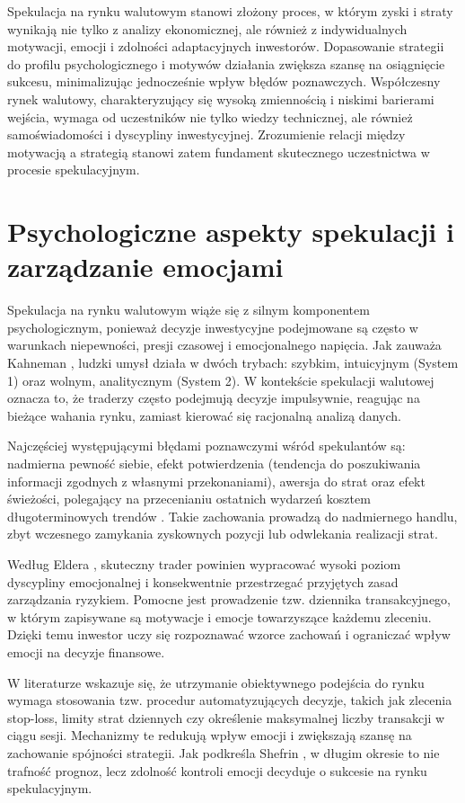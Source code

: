 Spekulacja na rynku walutowym stanowi złożony proces, w którym zyski i straty wynikają nie tylko z analizy ekonomicznej, ale również z indywidualnych motywacji, emocji i zdolności adaptacyjnych inwestorów. 
Dopasowanie strategii do profilu psychologicznego i motywów działania zwiększa szansę na osiągnięcie sukcesu, minimalizując jednocześnie wpływ błędów poznawczych. 
Współczesny rynek walutowy, charakteryzujący się wysoką zmiennością i niskimi barierami wejścia, wymaga od uczestników nie tylko wiedzy technicznej, ale również samoświadomości i dyscypliny inwestycyjnej. 
Zrozumienie relacji między motywacją a strategią stanowi zatem fundament skutecznego uczestnictwa w procesie spekulacyjnym.

\section{Psychologiczne aspekty spekulacji i zarządzanie emocjami}

Spekulacja na rynku walutowym wiąże się z silnym komponentem psychologicznym, ponieważ decyzje inwestycyjne podejmowane są często w warunkach niepewności, presji czasowej i emocjonalnego napięcia. 
Jak zauważa Kahneman \parencite{kahneman2011}, ludzki umysł działa w dwóch trybach: szybkim, intuicyjnym (System 1) oraz wolnym, analitycznym (System 2). 
W kontekście spekulacji walutowej oznacza to, że traderzy często podejmują decyzje impulsywnie, reagując na bieżące wahania rynku, zamiast kierować się racjonalną analizą danych. 

Najczęściej występującymi błędami poznawczymi wśród spekulantów są: nadmierna pewność siebie, efekt potwierdzenia (tendencja do poszukiwania informacji zgodnych z własnymi przekonaniami), 
awersja do strat oraz efekt świeżości, polegający na przecenianiu ostatnich wydarzeń kosztem długoterminowych trendów \parencite{shefrin2007}. 
Takie zachowania prowadzą do nadmiernego handlu, zbyt wczesnego zamykania zyskownych pozycji lub odwlekania realizacji strat. 

Według Eldera \parencite{elder2014}, skuteczny trader powinien wypracować wysoki poziom dyscypliny emocjonalnej i konsekwentnie przestrzegać przyjętych zasad zarządzania ryzykiem. 
Pomocne jest prowadzenie tzw. dziennika transakcyjnego, w którym zapisywane są motywacje i emocje towarzyszące każdemu zleceniu. 
Dzięki temu inwestor uczy się rozpoznawać wzorce zachowań i ograniczać wpływ emocji na decyzje finansowe. 

W literaturze wskazuje się, że utrzymanie obiektywnego podejścia do rynku wymaga stosowania tzw. procedur automatyzujących decyzje, takich jak zlecenia stop-loss, 
limity strat dziennych czy określenie maksymalnej liczby transakcji w ciągu sesji. 
Mechanizmy te redukują wpływ emocji i zwiększają szansę na zachowanie spójności strategii. 
Jak podkreśla Shefrin \parencite{shefrin2007}, w długim okresie to nie trafność prognoz, lecz zdolność kontroli emocji decyduje o sukcesie na rynku spekulacyjnym.

